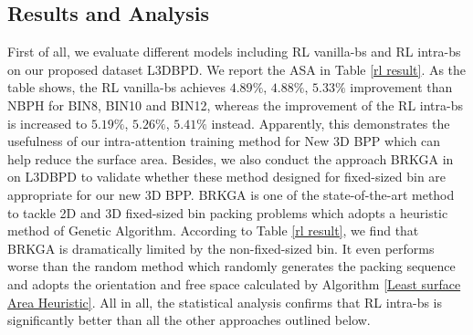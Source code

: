 \subsection{Results and Analysis}
\label{sec:eval}

First of all, we evaluate different models including RL vanilla-bs and RL intra-bs on our proposed dataset L3DBPD. We report the ASA in Table \ref{rl result}.
As the table shows, the RL vanilla-bs achieves $4.89\%$, $4.88\%$, $5.33\%$ improvement than NBPH for BIN8, BIN10 and BIN12, whereas the improvement of the RL intra-bs is increased to $5.19\%$, $5.26\%$, $5.41\%$ instead. Apparently, this demonstrates the usefulness of our intra-attention training method for New 3D BPP which can help reduce the surface area.
Besides, we also conduct the approach BRKGA in \cite{gonccalves2013biased} on L3DBPD to validate whether these method designed for fixed-sized bin are appropriate for our new 3D BPP.
BRKGA is one of the state-of-the-art method to tackle 2D and 3D fixed-sized bin packing problems which adopts a heuristic method of Genetic Algorithm.
According to Table \ref{rl result}, we find that BRKGA is dramatically limited by the non-fixed-sized bin. It even performs worse than the random method which randomly generates the packing sequence and adopts the orientation and free space calculated by Algorithm \ref{Least surface Area Heuristic}. All in all, the statistical analysis confirms that RL intra-bs is significantly better than all the other approaches outlined below.

